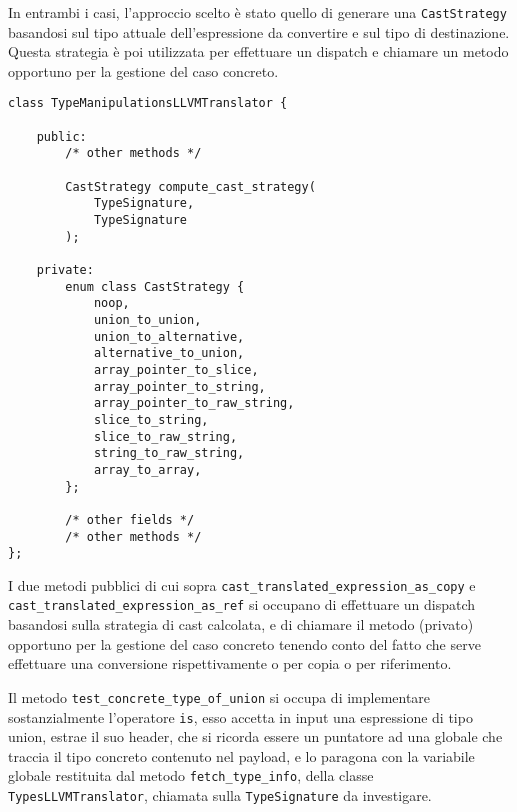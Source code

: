 In entrambi i casi, l'approccio scelto è stato quello di generare una \texttt{CastStrategy} basandosi sul tipo attuale dell'espressione da 
convertire e sul tipo di destinazione. Questa strategia è poi utilizzata per effettuare un dispatch e chiamare un metodo opportuno per la gestione 
del caso concreto. \\

\vspace{0.5cm}
\begin{lstlisting}[frame=single]
class TypeManipulationsLLVMTranslator {

    public:
        /* other methods */
        
        CastStrategy compute_cast_strategy(
            TypeSignature,
            TypeSignature
        );

    private:
        enum class CastStrategy {
            noop,
            union_to_union,
            union_to_alternative,
            alternative_to_union,
            array_pointer_to_slice,
            array_pointer_to_string,
            array_pointer_to_raw_string,
            slice_to_string,
            slice_to_raw_string,
            string_to_raw_string,
            array_to_array,
        };

        /* other fields */
        /* other methods */
};
\end{lstlisting}
\vspace{0.5cm}

I due metodi pubblici di cui sopra \texttt{cast\_translated\_expression\_as\_copy} e \texttt{cast\_translated\_expression\_as\_ref} si occupano di
effettuare un dispatch basandosi sulla strategia di cast calcolata, e di chiamare il metodo (privato) opportuno per la gestione del caso concreto
tenendo conto del fatto che serve effettuare una conversione rispettivamente o per copia o per riferimento. \\

\newpage

Il metodo \texttt{test\_concrete\_type\_of\_union} si occupa di implementare sostanzialmente l'operatore \texttt{is}, esso accetta in input una espressione
di tipo union, estrae il suo header, che si ricorda essere un puntatore ad una globale che traccia il tipo concreto contenuto nel payload, e lo paragona con 
la variabile globale restituita dal metodo \texttt{fetch\_type\_info}, della classe \texttt{TypesLLVMTranslator}, chiamata sulla \texttt{TypeSignature} 
da investigare. \\

